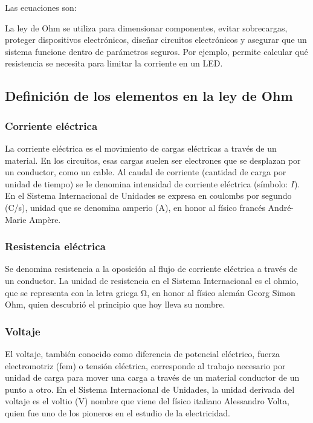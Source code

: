 \documentclass{article}
\begin{document}
    Las ecuaciones son:


    La ley de Ohm se utiliza para dimensionar componentes, evitar sobrecargas, proteger dispositivos electrónicos, diseñar circuitos electrónicos y asegurar que un sistema funcione dentro de parámetros seguros. Por ejemplo, permite calcular qué resistencia se necesita para limitar la corriente en un LED.\@

    \subsection*{Definición de los elementos en la ley de Ohm}

    \subsubsection*{Corriente eléctrica}

    La corriente eléctrica es el movimiento de cargas eléctricas a través de un material. En los circuitos, esas cargas suelen ser electrones que se desplazan por un conductor, como un cable. Al caudal de corriente (cantidad de carga por unidad de tiempo) se le denomina intensidad de corriente eléctrica (símbolo: $I$). En el Sistema Internacional de Unidades se expresa en coulombs por segundo (\unit[per-mode=symbol]{\coulomb\per\second}), unidad que se denomina amperio (\unit{\ampere}), en honor al físico francés André-Marie Ampère.

    \subsubsection*{Resistencia eléctrica}
    Se denomina resistencia a la oposición al flujo de corriente eléctrica a través de un conductor. La unidad de resistencia en el Sistema Internacional es el ohmio, que se representa con la letra griega \unit{\ohm}, en honor al físico alemán Georg Simon Ohm, quien descubrió el principio que hoy lleva su nombre.

    \subsubsection*{Voltaje}
    El voltaje, también conocido como diferencia de potencial eléctrico, fuerza electromotriz (fem) o tensión eléctrica, corresponde al trabajo necesario por unidad de carga para mover una carga a través de un material conductor de un punto a otro. En el Sistema Internacional de Unidades, la unidad derivada del voltaje es el voltio (\unit{\volt}) nombre que viene del físico italiano Alessandro Volta, quien fue uno de los pioneros en el estudio de la electricidad.
\end{document}
